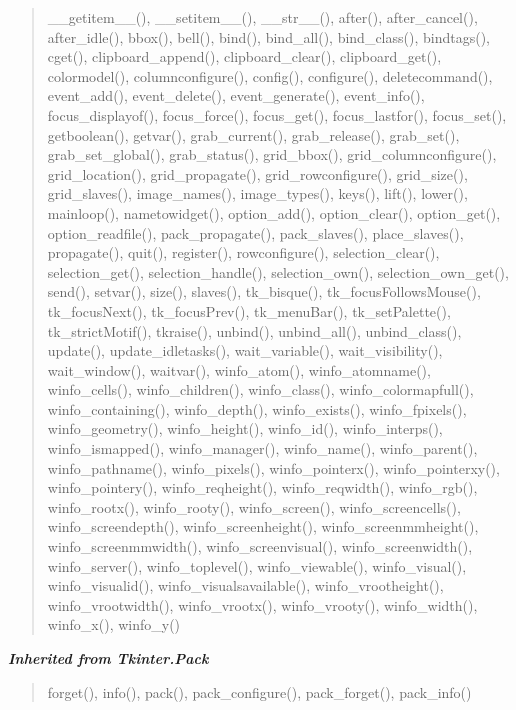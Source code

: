 \begin{quote}
\_\_getitem\_\_(), \_\_setitem\_\_(), \_\_str\_\_(), after(), after\_cancel(), after\_idle(), bbox(), bell(), bind(), bind\_all(), bind\_class(), bindtags(), cget(), clipboard\_append(), clipboard\_clear(), clipboard\_get(), colormodel(), columnconfigure(), config(), configure(), deletecommand(), event\_add(), event\_delete(), event\_generate(), event\_info(), focus\_displayof(), focus\_force(), focus\_get(), focus\_lastfor(), focus\_set(), getboolean(), getvar(), grab\_current(), grab\_release(), grab\_set(), grab\_set\_global(), grab\_status(), grid\_bbox(), grid\_columnconfigure(), grid\_location(), grid\_propagate(), grid\_rowconfigure(), grid\_size(), grid\_slaves(), image\_names(), image\_types(), keys(), lift(), lower(), mainloop(), nametowidget(), option\_add(), option\_clear(), option\_get(), option\_readfile(), pack\_propagate(), pack\_slaves(), place\_slaves(), propagate(), quit(), register(), rowconfigure(), selection\_clear(), selection\_get(), selection\_handle(), selection\_own(), selection\_own\_get(), send(), setvar(), size(), slaves(), tk\_bisque(), tk\_focusFollowsMouse(), tk\_focusNext(), tk\_focusPrev(), tk\_menuBar(), tk\_setPalette(), tk\_strictMotif(), tkraise(), unbind(), unbind\_all(), unbind\_class(), update(), update\_idletasks(), wait\_variable(), wait\_visibility(), wait\_window(), waitvar(), winfo\_atom(), winfo\_atomname(), winfo\_cells(), winfo\_children(), winfo\_class(), winfo\_colormapfull(), winfo\_containing(), winfo\_depth(), winfo\_exists(), winfo\_fpixels(), winfo\_geometry(), winfo\_height(), winfo\_id(), winfo\_interps(), winfo\_ismapped(), winfo\_manager(), winfo\_name(), winfo\_parent(), winfo\_pathname(), winfo\_pixels(), winfo\_pointerx(), winfo\_pointerxy(), winfo\_pointery(), winfo\_reqheight(), winfo\_reqwidth(), winfo\_rgb(), winfo\_rootx(), winfo\_rooty(), winfo\_screen(), winfo\_screencells(), winfo\_screendepth(), winfo\_screenheight(), winfo\_screenmmheight(), winfo\_screenmmwidth(), winfo\_screenvisual(), winfo\_screenwidth(), winfo\_server(), winfo\_toplevel(), winfo\_viewable(), winfo\_visual(), winfo\_visualid(), winfo\_visualsavailable(), winfo\_vrootheight(), winfo\_vrootwidth(), winfo\_vrootx(), winfo\_vrooty(), winfo\_width(), winfo\_x(), winfo\_y()
\end{quote}

\large{\textbf{\textit{Inherited from Tkinter.Pack}}}

\begin{quote}
forget(), info(), pack(), pack\_configure(), pack\_forget(), pack\_info()
\end{quote}

